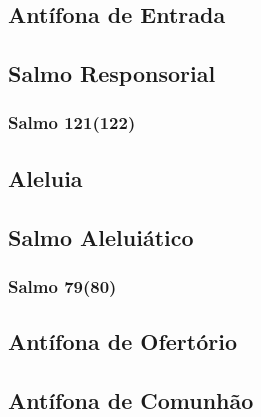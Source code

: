 \subsection{Antífona de Entrada}\label{subsection:tempus-adventus/missa-2/introitus}

\subsection[Salmo Responsorial]{Salmo Responsorial}\label{subsection:tempus-adventus/missa-2/psalmus-responsorius}
\subsubsection{Salmo 121(122)}

\AllowPageFlush

\subsection{Aleluia}\label{subsection:tempus-adventus/missa-2/alleluia}

\AllowPageFlush

\subsection[Salmo Aleluiático]{Salmo Aleluiático}\label{subsection:tempus-adventus/missa-2/psalmus-alleluiaticus}
\subsubsection{Salmo 79(80)}

\AllowPageFlush

\subsection{Antífona de Ofertório}\label{subsection:tempus-adventus/missa-2/offertorium}

\AllowPageFlush

\subsection{Antífona de Comunhão}\label{subsection:tempus-adventus/missa-2/communio}
